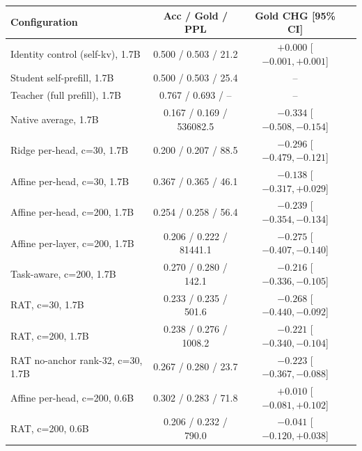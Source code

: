 \caption{Main audit results. Acc/gold/PPL: answer accuracy,
gold-letter probability, and perplexity of the scoring suffix for
the translated cache (kv-both). CHG is the gold-probability change
over the student's own prefill with 95\% bootstrap CIs. Pairs:
Qwen3-4B$\to$1.7B unless noted. All runs use disjoint
calibration/evaluation splits and the unified prompt format.}
\label{tab:main}
\small
\begin{tabular}{lccc}
\toprule
Configuration & Acc / Gold / PPL & Gold CHG [95\% CI] \\
\midrule
Identity control (self-kv), 1.7B & 0.500 / 0.503 / 21.2 & $+0.000$ [$-0.001, +0.001$] \\
Student self-prefill, 1.7B & 0.500 / 0.503 / 25.4 & -- \\
Teacher (full prefill), 1.7B & 0.767 / 0.693 / -- & -- \\
Native average, 1.7B & 0.167 / 0.169 / 536082.5 & $-0.334$ [$-0.508, -0.154$] \\
Ridge per-head, c=30, 1.7B & 0.200 / 0.207 / 88.5 & $-0.296$ [$-0.479, -0.121$] \\
Affine per-head, c=30, 1.7B & 0.367 / 0.365 / 46.1 & $-0.138$ [$-0.317, +0.029$] \\
Affine per-head, c=200, 1.7B & 0.254 / 0.258 / 56.4 & $-0.239$ [$-0.354, -0.134$] \\
Affine per-layer, c=200, 1.7B & 0.206 / 0.222 / 81441.1 & $-0.275$ [$-0.407, -0.140$] \\
Task-aware, c=200, 1.7B & 0.270 / 0.280 / 142.1 & $-0.216$ [$-0.336, -0.105$] \\
RAT, c=30, 1.7B & 0.233 / 0.235 / 501.6 & $-0.268$ [$-0.440, -0.092$] \\
RAT, c=200, 1.7B & 0.238 / 0.276 / 1008.2 & $-0.221$ [$-0.340, -0.104$] \\
RAT no-anchor rank-32, c=30, 1.7B & 0.267 / 0.280 / 23.7 & $-0.223$ [$-0.367, -0.088$] \\
Affine per-head, c=200, 0.6B & 0.302 / 0.283 / 71.8 & $+0.010$ [$-0.081, +0.102$] \\
RAT, c=200, 0.6B & 0.206 / 0.232 / 790.0 & $-0.041$ [$-0.120, +0.038$] \\
\bottomrule
\end{tabular}
